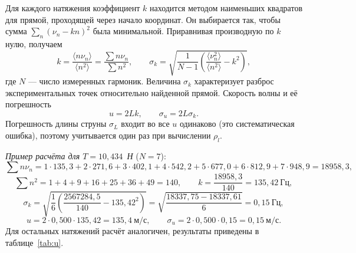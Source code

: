 \documentclass[12pt,a4paper]{article}
\begin{document}
Для каждого натяжения коэффициент $k$ находится методом наименьших квадратов для прямой, проходящей через начало координат. Он выбирается так, чтобы сумма $\sum_n(\nu_n-kn)^2$ была минимальной. Приравнивая производную по $k$ нулю, получаем
\begin{equation}
    k=\frac{\langle n\nu_n\rangle}{\langle n^2\rangle}=\frac{\sum n\nu_n}{\sum n^2},
    \qquad
    \sigma_k=\sqrt{\frac{1}{N-1}\left(\frac{\langle \nu_n^2\rangle}{\langle n^2\rangle}-k^2\right)},
    \label{eq:k}
\end{equation}
где $N$ --- число измеренных гармоник. Величина $\sigma_k$ характеризует разброс экспериментальных точек относительно найденной прямой. Скорость волны и её погрешность
\begin{equation}
    u=2Lk,\qquad \sigma_u=2L\sigma_k.
\end{equation}
Погрешность длины струны $\sigma_L$ входит во все $u$ одинаково (это систематическая ошибка), поэтому учитывается один раз при вычислении $\rho_l$.

\textit{Пример расчёта для $T=10{,}434$~Н} ($N=7$):
\begin{equation*}
    \sum n\nu_n = 1\cdot135{,}3+2\cdot271{,}6+3\cdot402{,}1+4\cdot542{,}2+5\cdot677{,}0+6\cdot812{,}9+7\cdot948{,}9 = 18958{,}3,
\end{equation*}
\begin{equation*}
    \sum n^2 = 1+4+9+16+25+36+49=140,\qquad k=\frac{18958{,}3}{140}=135{,}42~\text{Гц},
\end{equation*}
\begin{equation*}
    \sigma_k=\sqrt{\frac{1}{6}\left(\frac{2567284{,}5}{140}-135{,}42^2\right)}
    =\sqrt{\frac{18337{,}75-18337{,}61}{6}}=0{,}15~\text{Гц},
\end{equation*}
\begin{equation*}
    u=2\cdot0{,}500\cdot135{,}42=135{,}4~\text{м/с},\qquad \sigma_u=2\cdot0{,}500\cdot0{,}15=0{,}15~\text{м/с}.
\end{equation*}
Для остальных натяжений расчёт аналогичен, результаты приведены в таблице~\ref{tab:u}.
\end{document}

